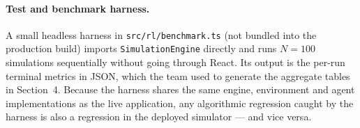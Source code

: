\paragraph{Test and benchmark harness.}
A small headless harness in \texttt{src/rl/benchmark.ts} (not bundled into the production build) imports \texttt{SimulationEngine} directly and runs $N = 100$ simulations sequentially without going through React. Its output is the per-run terminal metrics in JSON, which the team used to generate the aggregate tables in Section~4. Because the harness shares the same engine, environment and agent implementations as the live application, any algorithmic regression caught by the harness is also a regression in the deployed simulator --- and vice versa.

\newpage
